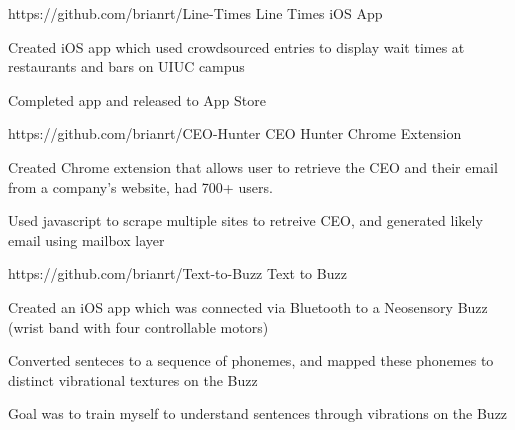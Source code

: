 

\begin{cventries}

  \cventry
    {https://github.com/brianrt/Line-Times} %
    {Line Times iOS App} %
    {} %
    {} %
    {
      \begin{cvitems} %
        \item {Created iOS app which used crowdsourced entries to display wait times at restaurants and bars on UIUC campus}
        \item {Completed app and released to App Store}
      \end{cvitems}
    }

  \cventry
    {https://github.com/brianrt/CEO-Hunter} %
    {CEO Hunter Chrome Extension} %
    {} %
    {} %
    {
      \begin{cvitems} %
        \item {Created Chrome extension that allows user to retrieve the CEO and their email from a company’s website, had 700+ users.}
        \item {Used javascript to scrape multiple sites to retreive CEO, and generated likely email using mailbox layer}
      \end{cvitems}
    }

  \cventry
    {https://github.com/brianrt/Text-to-Buzz} %
    {Text to Buzz} %
    {} %
    {} %
    {
      \begin{cvitems} %
        \item {Created an iOS app which was connected via Bluetooth to a Neosensory Buzz (wrist band with four controllable motors)}
        \item {Converted senteces to a sequence of phonemes, and mapped these phonemes to distinct vibrational textures on the Buzz}
        \item {Goal was to train myself to understand sentences through vibrations on the Buzz}
      \end{cvitems}
    }


\end{cventries}

